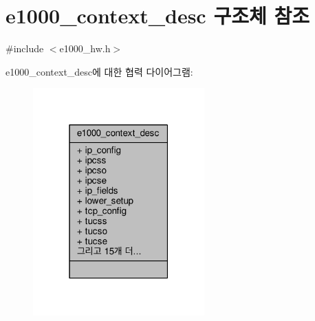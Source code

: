 \hypertarget{structe1000__context__desc}{}\section{e1000\+\_\+context\+\_\+desc 구조체 참조}
\label{structe1000__context__desc}


{\ttfamily \#include $<$e1000\+\_\+hw.\+h$>$}



e1000\+\_\+context\+\_\+desc에 대한 협력 다이어그램\+:
\nopagebreak
\begin{figure}[H]
\begin{center}
\leavevmode
\includegraphics[width=187pt]{structe1000__context__desc__coll__graph}
\end{center}
\end{figure}
